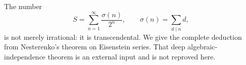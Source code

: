 The number
\[
 S=\sum_{n=1}^{\infty}\frac{\sigma(n)}{2^n},
 \qquad \sigma(n)=\sum_{d\mid n}d,
\]
is not merely irrational: it is transcendental.
We give the complete deduction from Nesterenko's theorem on
Eisenstein series. That deep algebraic-independence theorem
is an external input and is not reproved here.
